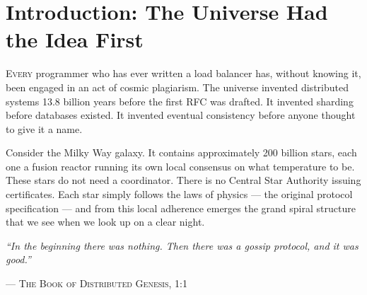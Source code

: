 \documentclass[12pt,a4paper]{article}
\begin{document}
\begin{abstract}
\noindent
We present a philosophical framework arguing that the observable universe
operates as a naturally-occurring distributed consensus system. Stars are
worker nodes, galaxies are sharded clusters, photons are gossip protocol
messages, and gravity is the ultimate Byzantine fault tolerance mechanism.
We demonstrate (with varying degrees of seriousness) that every problem
solved by modern reverse proxies --- load balancing, TLS termination,
connection pooling, backpressure, and graceful shutdown --- was first solved
by the cosmos approximately 13.8 billion years ago. We introduce the concept
of \textbf{Cosmic Flux}: the idea that information, energy, and consensus
flow through the universe in the same worker-per-core pattern that makes
high-performance networking possible. We conclude that building software
is really just the universe becoming aware of its own architecture.
\end{abstract}

\tableofcontents
\newpage

\section{Introduction: The Universe Had the Idea First}

\lettrine[lines=3, loversize=0.15]{\color{galaxypurple}E}{very} programmer who has
ever written a load balancer has, without knowing it, been engaged in an act of
cosmic plagiarism. The universe invented distributed systems 13.8 billion years
before the first RFC was drafted. It invented sharding before databases existed.
It invented eventual consistency before anyone thought to give it a name.

Consider the Milky Way galaxy. It contains approximately 200 billion stars, each
one a fusion reactor running its own local consensus on what temperature to be.
These stars do not need a coordinator. There is no Central Star Authority issuing
certificates. Each star simply follows the laws of physics --- the original protocol
specification --- and from this local adherence emerges the grand spiral structure
that we see when we look up on a clear night.

\epigraph{\textit{``In the beginning there was nothing. Then there was a gossip
protocol, and it was good.''}}{\textsc{--- The Book of Distributed Genesis, 1:1}}
\end{document}
